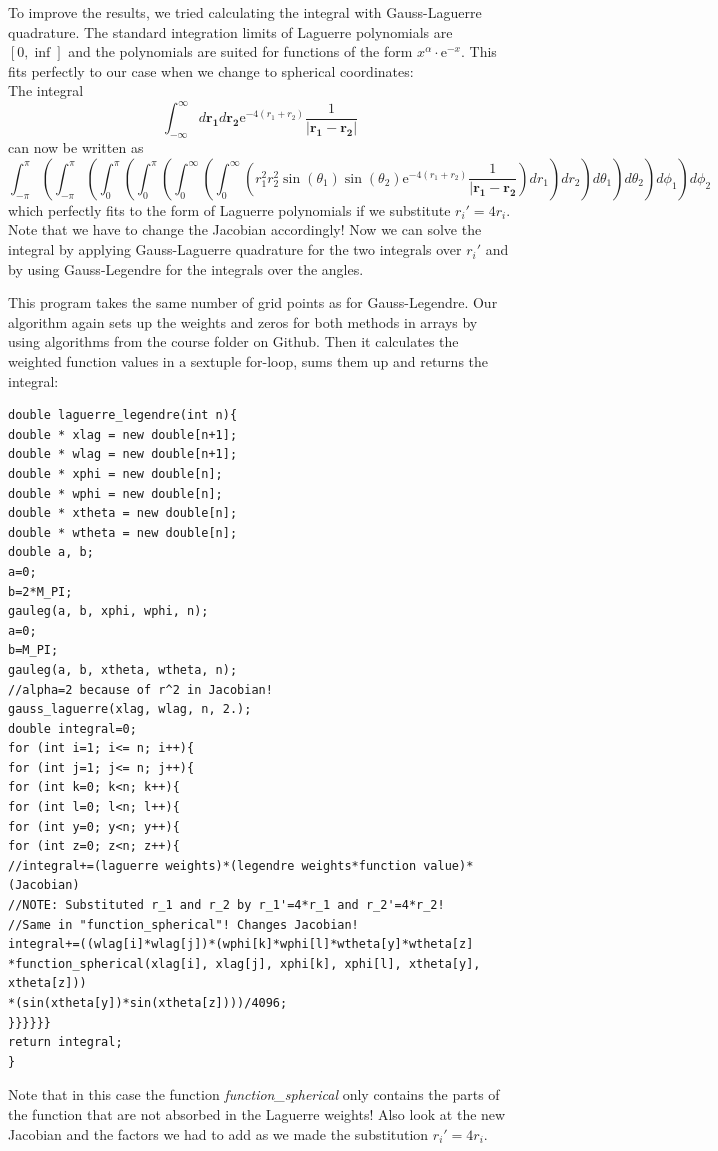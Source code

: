 \documentclass[10pt,a4paper]{article}
\begin{document}
To improve the results, we tried calculating the integral with Gauss-Laguerre quadrature. The standard integration limits of Laguerre polynomials are $[0,\inf]$ and the polynomials are suited for functions of the form $x^\alpha\cdot \mathrm{e}^{-x}$. This fits perfectly to our case when we change to spherical coordinates:\\
The integral
\begin{equation}
	\int_{-\infty}^{\infty} d\mathbf{r_1}d\mathbf{r_2}\mathrm{e}^{-4(r_1+r_2)}\frac{1}{|\mathbf{r_1}-\mathbf{r_2}|}
\end{equation}
can now be written as
\begin{equation}
	\int_{-\pi}^{\pi}\left(\int_{-\pi}^{\pi}\left(\int_{0}^{\pi}\left(\int_{0}^{\pi}\left(\int_{0}^{\infty}\left(\int_{0}^{\infty}\left(r_1^2r_2^2\sin(\theta_1)\sin(\theta_2)\mathrm{e}^{-4(r_1+r_2)}\frac{1}{|\mathbf{r_1}-\mathbf{r_2}}\right)dr_1\right)dr_2\right)d\theta_1\right)d\theta_2\right)d\phi_1\right)d\phi_2
\end{equation}
which perfectly fits to the form of Laguerre polynomials if we substitute $r_i'=4r_i$. Note that we have to change the Jacobian accordingly! Now we can solve the integral by applying Gauss-Laguerre quadrature for the two integrals over $r_i'$ and by using Gauss-Legendre for the integrals over the angles.

This program takes the same number of grid points as for Gauss-Legendre. Our algorithm again sets up the weights and zeros for both methods in arrays by using algorithms from the course folder on Github. Then it calculates the weighted function values in a sextuple for-loop, sums them up and returns the integral:
\clearpage
\begin{lstlisting}
double laguerre_legendre(int n){
double * xlag = new double[n+1];
double * wlag = new double[n+1];
double * xphi = new double[n];
double * wphi = new double[n];
double * xtheta = new double[n];
double * wtheta = new double[n];
double a, b;
a=0;
b=2*M_PI;
gauleg(a, b, xphi, wphi, n);
a=0;
b=M_PI;
gauleg(a, b, xtheta, wtheta, n);
//alpha=2 because of r^2 in Jacobian!
gauss_laguerre(xlag, wlag, n, 2.);
double integral=0;
for (int i=1; i<= n; i++){
for (int j=1; j<= n; j++){
for (int k=0; k<n; k++){
for (int l=0; l<n; l++){
for (int y=0; y<n; y++){
for (int z=0; z<n; z++){
//integral+=(laguerre weights)*(legendre weights*function value)*(Jacobian)
//NOTE: Substituted r_1 and r_2 by r_1'=4*r_1 and r_2'=4*r_2!
//Same in "function_spherical"! Changes Jacobian!
integral+=((wlag[i]*wlag[j])*(wphi[k]*wphi[l]*wtheta[y]*wtheta[z]
*function_spherical(xlag[i], xlag[j], xphi[k], xphi[l], xtheta[y], xtheta[z]))
*(sin(xtheta[y])*sin(xtheta[z])))/4096;
}}}}}}
return integral;
}
\end{lstlisting}
Note that in this case the function \emph{function\_spherical} only contains the parts of the function that are not absorbed in the Laguerre weights! Also look at the new Jacobian and the factors we had to add as we made the substitution $r_i'=4r_i$.
\end{document}
